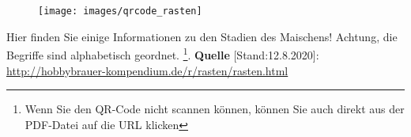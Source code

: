 \documentclass{scrartcl}  %
\begin{document}
\vspace{0.3cm}
			\begin{tcolorbox}[enhanced,
				colback=white,
				colframe=black,
				fonttitle=\sffamily\bfseries\large, 
				title=Informationen zu den Rasten,  %
				attach boxed title to top left={xshift=3.2mm,yshift=-0.50mm},
				boxed title style={skin=enhancedfirst jigsaw,size=small,arc=1mm,bottom=-1mm,colframe=black,height=0.75cm},
				colbacktitle=black,
				drop lifted shadow]
				\begin{figure}  
					\centering
					\vspace{-14pt}  %
					\texttt{[image: images/qrcode\_rasten]}
				\end{figure}
				
					Hier finden Sie einige Informationen zu den Stadien des Maischens! Achtung, die Begriffe sind alphabetisch geordnet. \footnote{Wenn Sie den QR-Code nicht scannen können, können Sie auch direkt aus der PDF-Datei auf die URL klicken}. \newline
					\textbf{Quelle} [Stand:12.8.2020]: \newline 
					\url{http://hobbybrauer-kompendium.de/r/rasten/rasten.html}
				\vspace{0.3cm}  %
			\end{tcolorbox}

\newpage

				
				
\end{document}
